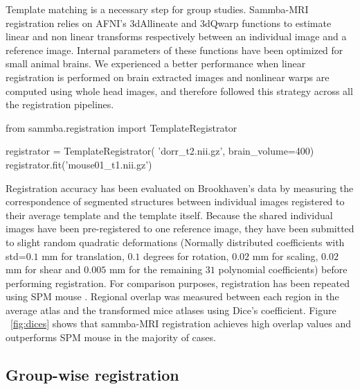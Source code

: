\documentclass[utf8, a4paper, final, crop]{frontiersSCNS} %
\begin{document}
Template matching is a necessary step for group studies.
%
%
Sammba-MRI registration relies on AFNI's 3dAllineate and 3dQwarp functions to 
estimate linear and non linear transforms respectively between an individual image
and a reference image. Internal parameters of these functions have been optimized for
small animal brains.
We experienced a better performance when linear registration
is performed on brain extracted images and nonlinear warps are computed
using whole head images, and therefore followed this strategy across all the 
registration pipelines.
\begin{python}
from sammba.registration import 
    TemplateRegistrator

registrator = TemplateRegistrator(
    'dorr_t2.nii.gz',
    brain_volume=400)
registrator.fit('mouse01_t1.nii.gz')
\end{python}

Registration accuracy has been evaluated on Brookhaven's data \citep{ma2008vivo} by 
measuring the correspondence of segmented structures between individual images 
registered 
to their average template and the template itself.
Because the shared individual images have been pre-registered to one reference image, 
they have been submitted to slight random quadratic deformations (Normally 
distributed coefficients with std=$0.1$ mm for translation, $0.1$ degrees for 
rotation, $0.02$ mm for scaling, $0.02$ mm for shear and $0.005$ mm for the remaining $31$ polynomial coefficients) before performing registration.
%
For comparison purposes, registration has been repeated using SPM mouse \citep{sawiak2009spmmouse}.
Regional overlap was measured
between each region in the average atlas and the transformed mice atlases 
using Dice's coefficient.
Figure ~\ref{fig:dices} shows that sammba-MRI registration achieves
high overlap values and outperforms SPM mouse in the majority of cases.

\subsection{Group-wise registration} %
%
\end{document}
